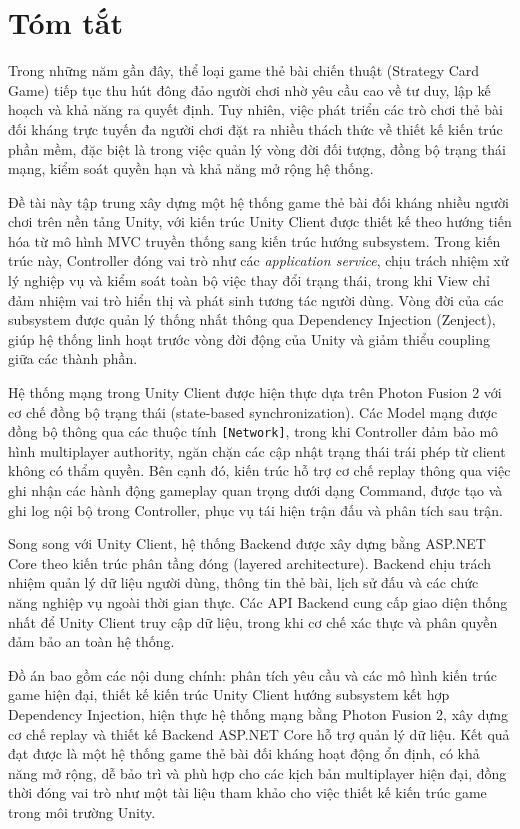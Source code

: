 \section*{Tóm tắt}
\thispagestyle{empty}

Trong những năm gần đây, thể loại game thẻ bài chiến thuật (Strategy Card Game) tiếp tục thu hút đông đảo người chơi nhờ yêu cầu cao về tư duy, lập kế hoạch và khả năng ra quyết định. Tuy nhiên, việc phát triển các trò chơi thẻ bài đối kháng trực tuyến đa người chơi đặt ra nhiều thách thức về thiết kế kiến trúc phần mềm, đặc biệt là trong việc quản lý vòng đời đối tượng, đồng bộ trạng thái mạng, kiểm soát quyền hạn và khả năng mở rộng hệ thống.

Đề tài này tập trung xây dựng một hệ thống game thẻ bài đối kháng nhiều người chơi trên nền tảng Unity, với kiến trúc Unity Client được thiết kế theo hướng tiến hóa từ mô hình MVC truyền thống sang kiến trúc hướng subsystem. Trong kiến trúc này, Controller đóng vai trò như các \textit{application service}, chịu trách nhiệm xử lý nghiệp vụ và kiểm soát toàn bộ việc thay đổi trạng thái, trong khi View chỉ đảm nhiệm vai trò hiển thị và phát sinh tương tác người dùng. Vòng đời của các subsystem được quản lý thống nhất thông qua Dependency Injection (Zenject), giúp hệ thống linh hoạt trước vòng đời động của Unity và giảm thiểu coupling giữa các thành phần.

Hệ thống mạng trong Unity Client được hiện thực dựa trên Photon Fusion 2 với cơ chế đồng bộ trạng thái (state-based synchronization). Các Model mạng được đồng bộ thông qua các thuộc tính \texttt{[Network]}, trong khi Controller đảm bảo mô hình multiplayer authority, ngăn chặn các cập nhật trạng thái trái phép từ client không có thẩm quyền. Bên cạnh đó, kiến trúc hỗ trợ cơ chế replay thông qua việc ghi nhận các hành động gameplay quan trọng dưới dạng Command, được tạo và ghi log nội bộ trong Controller, phục vụ tái hiện trận đấu và phân tích sau trận.

Song song với Unity Client, hệ thống Backend được xây dựng bằng ASP.NET Core theo kiến trúc phân tầng đóng (layered architecture). Backend chịu trách nhiệm quản lý dữ liệu người dùng, thông tin thẻ bài, lịch sử đấu và các chức năng nghiệp vụ ngoài thời gian thực. Các API Backend cung cấp giao diện thống nhất để Unity Client truy cập dữ liệu, trong khi cơ chế xác thực và phân quyền đảm bảo an toàn hệ thống.

Đồ án bao gồm các nội dung chính: phân tích yêu cầu và các mô hình kiến trúc game hiện đại, thiết kế kiến trúc Unity Client hướng subsystem kết hợp Dependency Injection, hiện thực hệ thống mạng bằng Photon Fusion 2, xây dựng cơ chế replay và thiết kế Backend ASP.NET Core hỗ trợ quản lý dữ liệu. Kết quả đạt được là một hệ thống game thẻ bài đối kháng hoạt động ổn định, có khả năng mở rộng, dễ bảo trì và phù hợp cho các kịch bản multiplayer hiện đại, đồng thời đóng vai trò như một tài liệu tham khảo cho việc thiết kế kiến trúc game trong môi trường Unity.


\clearpage
{}